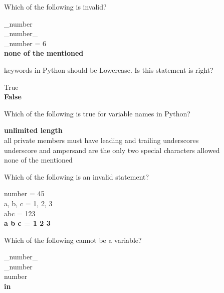 \documentclass{exam}
\begin{document}
\begin{questions}
    \question Which of the following is invalid?

    \begin{oneparchoices}
        \choice \_number \\
        \choice \_number\_ \\
        \choice \_number = 6 \\
        \choice \textbf{none of the mentioned}
    \end{oneparchoices} 

    \question keywords in Python should be Lowercase. Is this statement is right?

    \begin{oneparchoices}
        \choice True \\
        \choice \textbf{False}
    \end{oneparchoices}

    \question Which of the following is true for variable names in Python?

    \begin{oneparchoices}
        \choice \textbf{unlimited length} \\
        \choice all private members must have leading and trailing underscores \\
        \choice underscore and ampersand are the only two special characters allowed \\
        \choice none of the mentioned
    \end{oneparchoices}

    \question Which of the following is an invalid statement?

    \begin{oneparchoices}
        \choice number = 45 \\
        \choice a, b, c = 1, 2, 3 \\
        \choice abc = 123 \\
        \choice \textbf{a b c = 1 2 3}
    \end{oneparchoices}

    \quetsion Which of the following cannot be a variable?

    \begin{oneparchoices}
        \choice \_number\_ \\
        \choice \_number \\
        \choice number\\
        \choice \textbf{in}
    \end{oneparchoices}


\end{questions}
\end{document}
